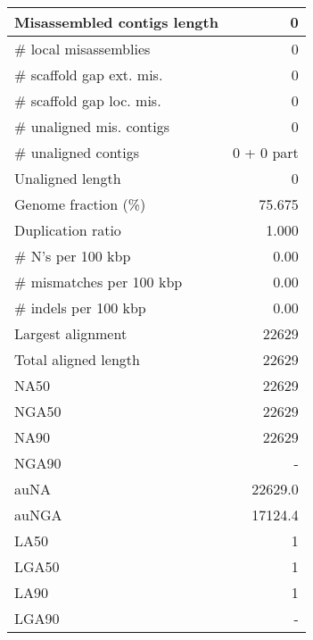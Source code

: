 \documentclass[12pt,a4paper]{article}
\begin{document}
\begin{table}[ht]
\begin{center}
\begin{tabular}{|l*{1}{|r}|}
Misassembled contigs length & 0 \\ \hline
\# local misassemblies & 0 \\ \hline
\# scaffold gap ext. mis. & 0 \\ \hline
\# scaffold gap loc. mis. & 0 \\ \hline
\# unaligned mis. contigs & 0 \\ \hline
\# unaligned contigs & 0 + 0 part \\ \hline
Unaligned length & 0 \\ \hline
Genome fraction (\%) & 75.675 \\ \hline
Duplication ratio & 1.000 \\ \hline
\# N's per 100 kbp & 0.00 \\ \hline
\# mismatches per 100 kbp & 0.00 \\ \hline
\# indels per 100 kbp & 0.00 \\ \hline
Largest alignment & 22629 \\ \hline
Total aligned length & 22629 \\ \hline
NA50 & 22629 \\ \hline
NGA50 & 22629 \\ \hline
NA90 & 22629 \\ \hline
NGA90 & - \\ \hline
auNA & 22629.0 \\ \hline
auNGA & 17124.4 \\ \hline
LA50 & 1 \\ \hline
LGA50 & 1 \\ \hline
LA90 & 1 \\ \hline
LGA90 & - \\ \hline
\end{tabular}
\end{center}
\end{table}
\end{document}
